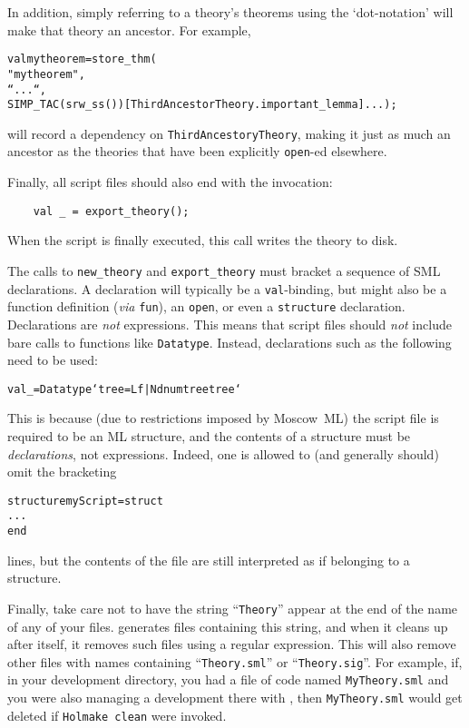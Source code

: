 In addition, simply referring to a theory's theorems using the `dot-notation' will make that theory an ancestor.
For example,
\begin{alltt}
    val mytheorem = store_thm(
      "mytheorem",
      ``...``,
      SIMP_TAC (srw_ss()) [ThirdAncestorTheory.important_lemma] ...);
\end{alltt}
will record a dependency on \texttt{ThirdAncestoryTheory}, making it just as much an ancestor as the theories that have been explicitly \texttt{open}-ed elsewhere.

Finally, all script files should also end with the invocation:
\begin{verbatim}
    val _ = export_theory();
\end{verbatim}
When the script is finally executed, this call writes the theory to disk.

The calls to \texttt{new_theory} and \texttt{export_theory} must bracket a sequence of SML declarations.
A declaration will typically be a \texttt{val}-binding, but might also be a function definition (\emph{via} \texttt{fun}), an \texttt{open}, or even a \texttt{structure} declaration.
Declarations are \emph{not} expressions.
This means that script files should \emph{not} include bare calls to \HOL{} functions like \texttt{Datatype}.
Instead, declarations such as the following need to be used:
\begin{alltt}
    val _ = Datatype`tree = Lf | Nd num tree tree`
\end{alltt}
This is because (due to restrictions imposed by Moscow~ML) the script file is required to be an ML structure, and the contents of a structure must be \emph{declarations}, not expressions.
Indeed, one is allowed to (and generally should) omit the bracketing
\begin{alltt}
  structure myScript = struct
  ...
  end
\end{alltt}
lines, but the contents of the file are still interpreted as if belonging to a structure.

Finally, take care not to have the string ``\texttt{Theory}'' appear at the end of the name of any of your files.
\HOL{} generates files containing this string, and when it cleans up after itself, it removes such files using a regular expression.
This will also remove other files with names containing ``\texttt{Theory.sml}'' or ``\texttt{Theory.sig}''.
For example, if, in your development directory, you had a file of \ML{} code named \texttt{MyTheory.sml} and you were also managing a \HOL{} development there with \holmake, then \texttt{MyTheory.sml} would get deleted if \texttt{Holmake~clean} were invoked.

